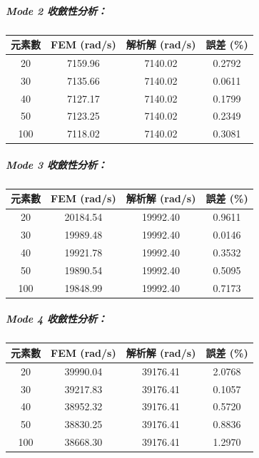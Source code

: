 \documentclass[UTF8, a4paper, 12pt]{ctexart}
\begin{document}
\subparagraph{Mode 2 收斂性分析：}

\begin{center}
\begin{tabular}{cccc}
\toprule
\textbf{元素數} & \textbf{FEM (rad/s)} & \textbf{解析解 (rad/s)} & \textbf{誤差 (\%)} \\
\midrule
20 & 7159.96 & 7140.02 & 0.2792 \\
30 & 7135.66 & 7140.02 & 0.0611 \\
40 & 7127.17 & 7140.02 & 0.1799 \\
50 & 7123.25 & 7140.02 & 0.2349 \\
100 & 7118.02 & 7140.02 & 0.3081 \\
\bottomrule
\end{tabular}
\end{center}

\subparagraph{Mode 3 收斂性分析：}

\begin{center}
\begin{tabular}{cccc}
\toprule
\textbf{元素數} & \textbf{FEM (rad/s)} & \textbf{解析解 (rad/s)} & \textbf{誤差 (\%)} \\
\midrule
20 & 20184.54 & 19992.40 & 0.9611 \\
30 & 19989.48 & 19992.40 & 0.0146 \\
40 & 19921.78 & 19992.40 & 0.3532 \\
50 & 19890.54 & 19992.40 & 0.5095 \\
100 & 19848.99 & 19992.40 & 0.7173 \\
\bottomrule
\end{tabular}
\end{center}

\subparagraph{Mode 4 收斂性分析：}

\begin{center}
\begin{tabular}{cccc}
\toprule
\textbf{元素數} & \textbf{FEM (rad/s)} & \textbf{解析解 (rad/s)} & \textbf{誤差 (\%)} \\
\midrule
20 & 39990.04 & 39176.41 & 2.0768 \\
30 & 39217.83 & 39176.41 & 0.1057 \\
40 & 38952.32 & 39176.41 & 0.5720 \\
50 & 38830.25 & 39176.41 & 0.8836 \\
100 & 38668.30 & 39176.41 & 1.2970 \\
\bottomrule
\end{tabular}
\end{center}
\end{document}

